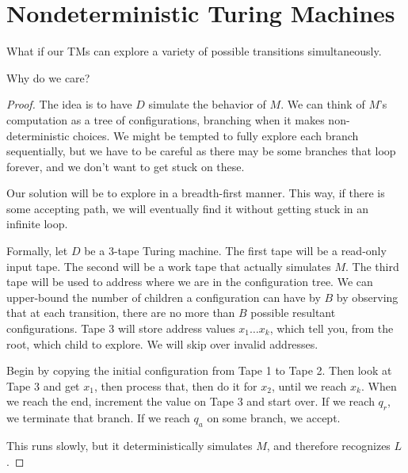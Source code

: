 


\section{Nondeterministic Turing Machines}

What if our TMs can explore a variety of possible transitions simultaneously.



Why do we care?


\begin{proof}
	
	The idea is to have $D$ simulate the behavior of $M$.  We can think of $M$'s computation as a tree of configurations, branching when it makes non-deterministic choices.  We might be tempted to fully explore each branch sequentially, but we have to be careful as there may be some branches that loop forever, and we don't want to get stuck on these.
	
	Our solution will be to explore in a breadth-first manner.  This way, if there is some accepting path, we will eventually find it without getting stuck in an infinite loop.
	
	Formally, let $D$ be a 3-tape Turing machine.  The first tape will be a read-only input tape.  The second will be a work tape that actually simulates $M$.  The third tape will be used to address where we are in the configuration tree.  We can upper-bound the number of children a configuration can have by $B$ by observing that at each transition, there are no more than $B$ possible resultant configurations.  Tape $3$ will store address values $x_1\dots x_k$, which tell you, from the root, which child to explore.  We will skip over invalid addresses.
	
	Begin by copying the initial configuration from Tape 1 to Tape 2.  Then look at Tape 3 and get $x_1$, then process that, then do it for $x_2$, until we reach $x_k$.  When we reach the end, increment the value on Tape 3 and start over.  If we reach $q_r$, we terminate that branch. If we reach $q_a$ on some branch, we accept. 
	
	This runs slowly, but it deterministically simulates $M$, and therefore recognizes $L$.
	
	
\end{proof}


